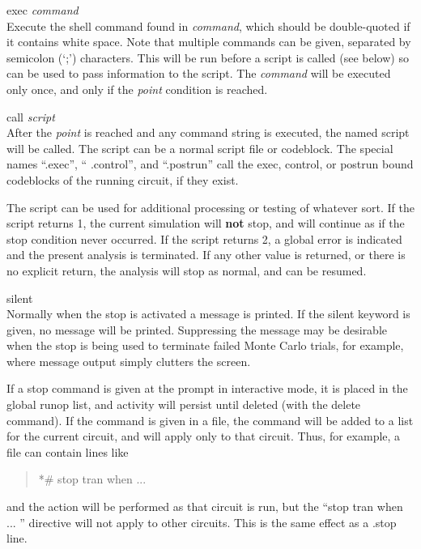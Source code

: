 \begin{description}
\item{\vt exec} {\it command}\\
Execute the {\WRspice} shell command found in {\it command\/}, which
should be double-quoted if it contains white space.  Note that
multiple commands can be given, separated by semicolon ({\vt `;'})
characters.  This will be run before a script is called (see below) so
can be used to pass information to the script.  The {\it command} will
be executed only once, and only if the {\it point} condition is
reached.

\item{\vt call} {\it script}\\
After the {\it point} is reached and any command string is executed,
the named script will be called.  The script can be a normal script
file or codeblock.  The special names ``{\vt .exec}'', ``{\vt
.control}'', and ``{\vt .postrun}'' call the exec, control, or postrun
bound codeblocks of the running circuit, if they exist.

The script can be used for additional processing or testing of
whatever sort.  If the script returns 1, the current simulation will
{\bf not} stop, and will continue as if the stop condition never
occurred.  If the script returns 2, a global error is indicated and
the present analysis is terminated.  If any other value is returned,
or there is no explicit return, the analysis will stop as normal, and
can be resumed.

\item{\vt silent}\\
Normally when the stop is activated a message is printed.  If the {\vt
silent} keyword is given, no message will be printed.  Suppressing the
message may be desirable when the stop is being used to terminate
failed Monte Carlo trials, for example, where message output simply
clutters the screen.
\end{description}

If a {\cb stop} command is given at the prompt in interactive mode, it
is placed in the global runop list, and activity will persist until
deleted (with the {\cb delete} command).  If the command is given in a
file, the command will be added to a list for the current circuit, and
will apply only to that circuit.  Thus, for example, a {\WRspice} file
can contain lines like
\begin{quote}\vt
*\# stop tran when ...
\end{quote}
and the action will be performed as that circuit is run, but the
``{\vt stop tran when ...  }'' directive will not apply to other
circuits.  This is the same effect as a {\vt .stop} line.


